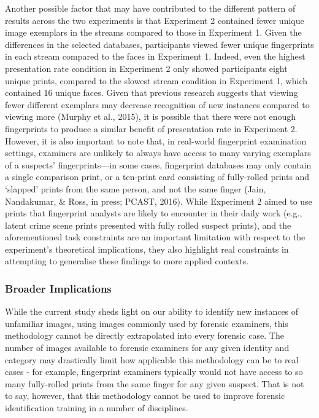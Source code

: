 \documentclass[
  english,
  man]{apa6}
\begin{document}
Another possible factor that may have contributed to the different pattern of results across the two experiments is that Experiment 2 contained fewer unique image exemplars in the streams compared to those in Experiment 1. Given the differences in the selected databases, participants viewed fewer unique fingerprints in each stream compared to the faces in Experiment 1. Indeed, even the highest presentation rate condition in Experiment 2 only showed participants eight unique prints, compared to the slowest stream condition in Experiment 1, which contained 16 unique faces. Given that previous research suggests that viewing fewer different exemplars may decrease recognition of new instances compared to viewing more (Murphy et al., 2015), it is possible that there were not enough fingerprints to produce a similar benefit of presentation rate in Experiment 2. However, it is also important to note that, in real-world fingerprint examination settings, examiners are unlikely to always have access to many varying exemplars of a suspects' fingerprints---in some cases, fingerprint databases may only contain a single comparison print, or a ten-print card consisting of fully-rolled prints and `slapped' prints from the same person, and not the same finger (Jain, Nandakumar, \& Ross, in press; PCAST, 2016). While Experiment 2 aimed to use prints that fingerprint analysts are likely to encounter in their daily work (e.g., latent crime scene prints presented with fully rolled suspect prints), and the aforementioned task constraints are an important limitation with respect to the experiment's theoretical implications, they also highlight real constraints in attempting to generalise these findings to more applied contexts.

\hypertarget{broader-implications}{%
\subsubsection{Broader Implications}\label{broader-implications}}

While the current study sheds light on our ability to identify new instances of unfamiliar images, using images commonly used by forensic examiners, this methodology cannot be directly extrapolated into every forensic case. The number of images available to forensic examiners for any given identity and category may drastically limit how applicable this methodology can be to real cases - for example, fingerprint examiners typically would not have access to so many fully-rolled prints from the same finger for any given suspect. That is not to say, however, that this methodology cannot be used to improve forensic identification training in a number of disciplines.
\end{document}
